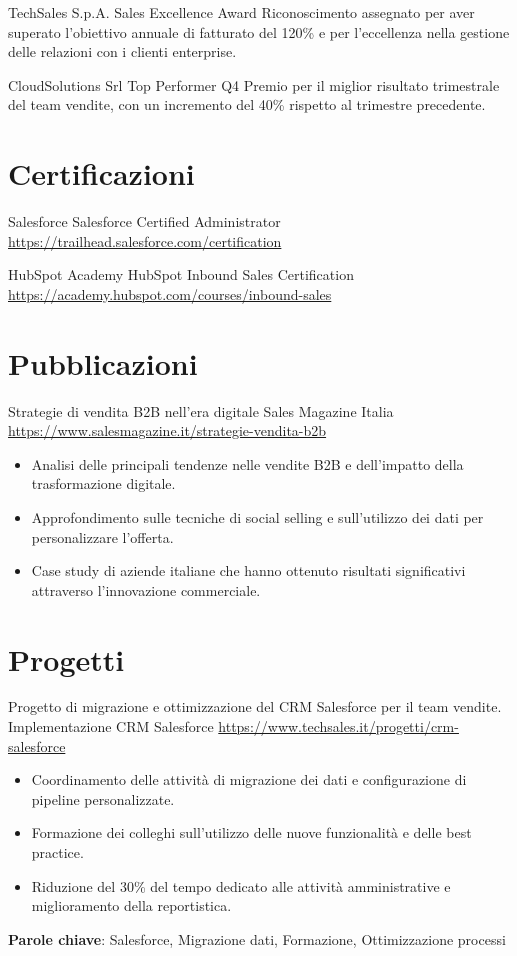 \documentclass[a4paper, serif, 10pt]{moderncv}
\begin{document}
        {TechSales S.p.A.}
        {Sales Excellence Award}
        {}
        {}
        {Riconoscimento assegnato per aver superato l'obiettivo annuale di fatturato del 120\% e per l'eccellenza nella gestione delle relazioni con i clienti enterprise.}

        {CloudSolutions Srl}
        {Top Performer Q4}
        {}
        {}
        {Premio per il miglior risultato trimestrale del team vendite, con un incremento del 40\% rispetto al trimestre precedente.}
\section{Certificazioni}

        {Salesforce}
        {Salesforce Certified Administrator}
        {\url{https://trailhead.salesforce.com/certification}}
        {}
        {}

        {HubSpot Academy}
        {HubSpot Inbound Sales Certification}
        {\url{https://academy.hubspot.com/courses/inbound-sales}}
        {}
        {}
\section{Pubblicazioni}

        {Strategie di vendita B2B nell'era digitale}
        {Sales Magazine Italia}
        {\url{https://www.salesmagazine.it/strategie-vendita-b2b}}
        {}
        {\begin{itemize}
\item Analisi delle principali tendenze nelle vendite B2B e dell'impatto della trasformazione digitale.
\item Approfondimento sulle tecniche di social selling e sull'utilizzo dei dati per personalizzare l'offerta.
\item Case study di aziende italiane che hanno ottenuto risultati significativi attraverso l'innovazione commerciale.
\end{itemize}}
\section{Progetti}

        {Progetto di migrazione e ottimizzazione del CRM Salesforce per il team vendite.}
        {Implementazione CRM Salesforce}
        {\url{https://www.techsales.it/progetti/crm-salesforce}}
        {}
        {\begin{itemize}
\item Coordinamento delle attività di migrazione dei dati e configurazione di pipeline personalizzate.
\item Formazione dei colleghi sull'utilizzo delle nuove funzionalità e delle best practice.
\item Riduzione del 30\% del tempo dedicato alle attività amministrative e miglioramento della reportistica.
\end{itemize}
\textbf{Parole chiave}: Salesforce, Migrazione dati, Formazione, Ottimizzazione processi}
\end{document}
